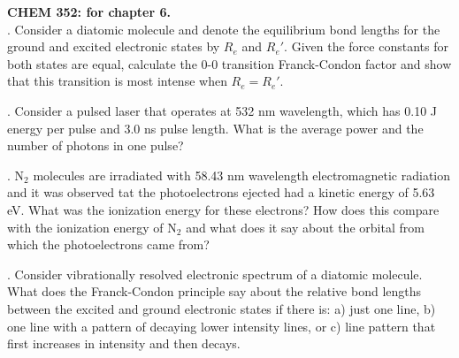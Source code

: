 \noindent
\textbf{CHEM 352:
 for chapter 6.}\\

. Consider a diatomic molecule and denote the equilibrium bond lengths for the ground and excited electronic states by $R_e$ and $R_e'$. Given the force constants for both states are equal, calculate the 0-0 transition Franck-Condon factor and show that this transition is most intense when $R_e = R_e'$.\\


. Consider a pulsed laser that operates at 532 nm wavelength, which has 0.10 J energy per pulse and 3.0 ns pulse length.
What is the average power and the number of photons in one pulse?


. N$_2$ molecules are irradiated with 58.43 nm wavelength electromagnetic radiation and it was observed tat the photoelectrons 
ejected had a kinetic energy of 5.63 eV. What was the ionization energy for these electrons? How does this compare with the
ionization energy of N$_2$ and what does it say about the orbital from which the photoelectrons came from?


. Consider vibrationally resolved electronic spectrum of a diatomic molecule. What does the Franck-Condon principle say about
the relative bond lengths between the excited and ground electronic states if there is:
a) just one line, b) one line with a pattern of decaying lower intensity lines, or c) line pattern that first increases in 
intensity and then decays.


